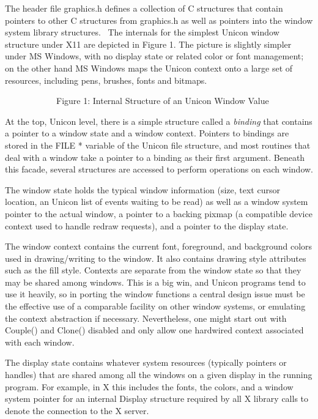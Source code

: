 The header file \textsf{graphics.h} defines a collection of C
structures that contain pointers to other C structures from
\textsf{graphics.h} as well as pointers into the window system library
structures. \ The internals for the simplest Unicon window structure
under X11 are depicted in Figure 1. The picture is slightly simpler
under MS Windows, with no display state or related color or font
management; on the other hand MS Windows maps the Unicon context onto
a large set of resources, including pens, brushes, fonts and bitmaps.


\bigskip


\bigskip


\bigskip


\ \  \ \ \ \ \ \ \ \ \ \ Figure 1: Internal Structure of an Unicon Window Value


At the top, Unicon level, there is a simple structure called a
\textit{binding} that contains a pointer to a window state and a
window context. Pointers to bindings are stored in the \textsf{FILE *}
variable of the Unicon file structure, and most routines that deal
with a window take a pointer to a binding as their first
argument. Beneath this facade, several structures are accessed to
perform operations on each window.

The window state holds the typical window information (size, text
cursor location, an Unicon list of events waiting to be read) as well
as a window system pointer to the actual window, a pointer to a
backing pixmap (a {\textquotedbl}compatible device
context{\textquotedbl} used to handle redraw requests), and a pointer
to the display state.

The window context contains the current font, foreground, and
background colors used in drawing/writing to the window.  It also
contains drawing style attributes such as the fill style. Contexts are
separate from the window state so that they may be shared among
windows. This is a big win, and Unicon programs tend to use it
heavily, so in porting the window functions a central design issue
must be the effective use of a comparable facility on other window
systems, or emulating the context abstraction if
necessary. Nevertheless, one might start out with \textsf{Couple()}
and \textsf{Clone()} disabled and only allow one hardwired context
associated with each window.

The display state contains whatever system resources (typically
pointers or handles) that are shared among all the windows on a given
display in the running program. For example, in X this includes the
fonts, the colors, and a window system pointer for an internal Display
structure required by all X library calls to denote the connection to
the X server.


